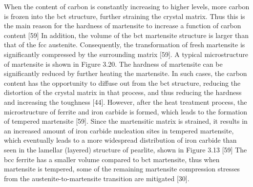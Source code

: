 \documentclass[12pt]{report}
\begin{document}

When the content of carbon is constantly increasing to higher levels, more carbon is frozen into the bct structure, further straining the crystal matrix. Thus this is the main reason for the hardness of martensite to increase a function of carbon content [59] In addition, the volume of the bct martensite structure is larger than that of the fcc austenite. Consequently, the transformation of fresh martensite is significantly compressed by the surrounding matrix [59]. A typical microstructure of martensite is shown in Figure 3.20.
The hardness of martensite can be significantly reduced by further heating the martensite. In such cases, the carbon content has the opportunity to diffuse out from the bct structure, reducing the distortion of the crystal matrix in that process, and thus reducing the hardness and increasing the toughness [44]. However, after the heat treatment process, the microstructure of ferrite and iron carbide is formed, which leads to the formation of tempered martensite [59]. Since the martensitic matrix is strained, it results in an increased amount of iron carbide nucleation sites in tempered martensite, which eventually leads to a more widespread distribution of iron carbide than seen in the lamellar (layered) structure of pearlite, shown in Figure 3.13 [59] The bcc ferrite has a smaller volume compared to bct martensite, thus when martensite is tempered, some of the remaining martensite compression stresses from the austenite-to-martensite transition are mitigated [30].
    
\end{document}
